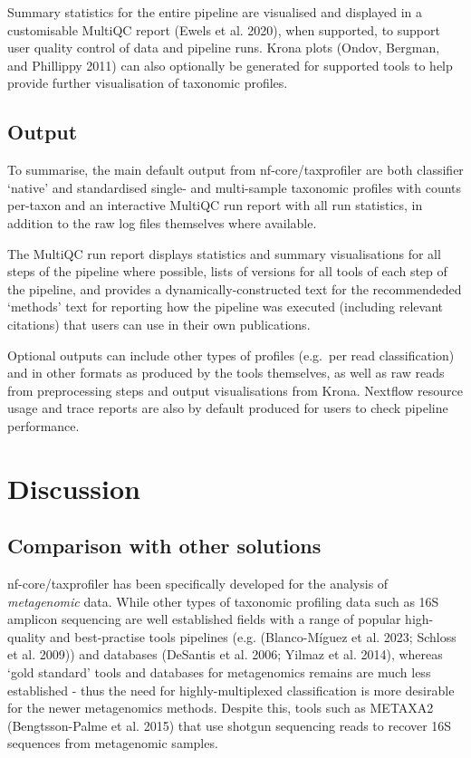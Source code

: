 \documentclass[
]{article}
\begin{document}
Summary statistics for the entire pipeline are visualised and displayed
in a customisable MultiQC report (Ewels et al. 2020), when supported, to
support user quality control of data and pipeline runs. Krona plots
(Ondov, Bergman, and Phillippy 2011) can also optionally be generated
for supported tools to help provide further visualisation of taxonomic
profiles.

\hypertarget{output}{%
\subsection{Output}\label{output}}

To summarise, the main default output from nf-core/taxprofiler are both
classifier `native' and standardised single- and multi-sample taxonomic
profiles with counts per-taxon and an interactive MultiQC run report
with all run statistics, in addition to the raw log files themselves
where available.

The MultiQC run report displays statistics and summary visualisations
for all steps of the pipeline where possible, lists of versions for all
tools of each step of the pipeline, and provides a
dynamically-constructed text for the recommendeded `methods' text for
reporting how the pipeline was executed (including relevant citations)
that users can use in their own publications.

Optional outputs can include other types of profiles (e.g.~per read
classification) and in other formats as produced by the tools
themselves, as well as raw reads from preprocessing steps and output
visualisations from Krona. Nextflow resource usage and trace reports are
also by default produced for users to check pipeline performance.

\hypertarget{discussion}{%
\section{Discussion}\label{discussion}}

\hypertarget{comparison-with-other-solutions}{%
\subsection{Comparison with other
solutions}\label{comparison-with-other-solutions}}

nf-core/taxprofiler has been specifically developed for the analysis of
\emph{metagenomic} data. While other types of taxonomic profiling data
such as 16S amplicon sequencing are well established fields with a range
of popular high-quality and best-practise tools pipelines (e.g.
(Blanco-Míguez et al. 2023; Schloss et al. 2009)) and databases
(DeSantis et al. 2006; Yilmaz et al. 2014), whereas `gold standard'
tools and databases for metagenomics remains are much less established -
thus the need for highly-multiplexed classification is more desirable
for the newer metagenomics methods. Despite this, tools such as METAXA2
(Bengtsson-Palme et al. 2015) that use shotgun sequencing reads to
recover 16S sequences from metagenomic samples.
\end{document}
